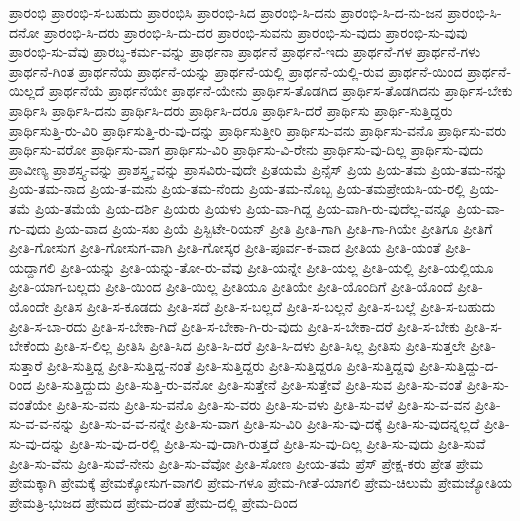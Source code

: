 {ಪ್ರಾರಂಭಿ
ಪ್ರಾರಂಭಿ-ಸ-ಬಹುದು
ಪ್ರಾರಂಭಿಸಿ
ಪ್ರಾರಂಭಿ-ಸಿದ
ಪ್ರಾರಂಭಿ-ಸಿ-ದನು
ಪ್ರಾರಂಭಿ-ಸಿ-ದ-ನು-ಜನ
ಪ್ರಾರಂಭಿ-ಸಿ-ದನೋ
ಪ್ರಾರಂಭಿ-ಸಿ-ದರು
ಪ್ರಾರಂಭಿ-ಸಿ-ದು-ದರ
ಪ್ರಾರಂಭಿ-ಸುವನು
ಪ್ರಾರಂಭಿ-ಸು-ವುದು
ಪ್ರಾರಂಭಿ-ಸು-ವುವು
ಪ್ರಾರಂಭಿ-ಸು-ವೆವು
ಪ್ರಾರಬ್ಧ-ಕರ್ಮ-ವನ್ನು
ಪ್ರಾರ್ಥನಾ
ಪ್ರಾರ್ಥನೆ
ಪ್ರಾರ್ಥನೆ-ಇದು
ಪ್ರಾರ್ಥನೆ-ಗಳ
ಪ್ರಾರ್ಥನೆ-ಗಳು
ಪ್ರಾರ್ಥನೆ-ಗಿಂತ
ಪ್ರಾರ್ಥನೆಯ
ಪ್ರಾರ್ಥನೆ-ಯನ್ನು
ಪ್ರಾರ್ಥನೆ-ಯಲ್ಲಿ
ಪ್ರಾರ್ಥನೆ-ಯಲ್ಲಿ-ರುವ
ಪ್ರಾರ್ಥನೆ-ಯಿಂದ
ಪ್ರಾರ್ಥನೆ-ಯಿಲ್ಲದೆ
ಪ್ರಾರ್ಥನೆಯೆ
ಪ್ರಾರ್ಥನೆಯೇ
ಪ್ರಾರ್ಥನೆ-ಯೇನು
ಪ್ರಾರ್ಥಿಸ-ತೊಡಗಿದ
ಪ್ರಾರ್ಥಿಸ-ತೊಡಗಿದನು
ಪ್ರಾರ್ಥಿಸ-ಬೇಕು
ಪ್ರಾರ್ಥಿಸಿ
ಪ್ರಾರ್ಥಿಸಿ-ದನು
ಪ್ರಾರ್ಥಿಸಿ-ದರು
ಪ್ರಾರ್ಥಿಸಿ-ದರೂ
ಪ್ರಾರ್ಥಿಸಿ-ದರೆ
ಪ್ರಾರ್ಥಿಸು
ಪ್ರಾರ್ಥಿ-ಸುತ್ತಿದ್ದರು
ಪ್ರಾರ್ಥಿಸುತ್ತಿ-ರು-ವಿರಿ
ಪ್ರಾರ್ಥಿಸುತ್ತಿ-ರು-ವು-ದನ್ನು
ಪ್ರಾರ್ಥಿಸುತ್ತೀರಿ
ಪ್ರಾರ್ಥಿಸು-ವನು
ಪ್ರಾರ್ಥಿಸು-ವನೊ
ಪ್ರಾರ್ಥಿಸು-ವರು
ಪ್ರಾರ್ಥಿಸು-ವರೋ
ಪ್ರಾರ್ಥಿಸು-ವಾಗ
ಪ್ರಾರ್ಥಿಸು-ವಿರಿ
ಪ್ರಾರ್ಥಿಸು-ವಿ-ರೇನು
ಪ್ರಾರ್ಥಿಸು-ವು-ದಿಲ್ಲ
ಪ್ರಾರ್ಥಿಸು-ವುದು
ಪ್ರಾವೀಣ್ಯ
ಪ್ರಾಶಸ್ತ್ಯ-ವನ್ನು
ಪ್ರಾಶಸ್ತ್ರ್ಯ-ವನ್ನು
ಪ್ರಾಸವಿರು-ವುದೇ
ಪ್ರಿತಯಮೆ
ಪ್ರಿನ್ಸೆಸ್
ಪ್ರಿಯ
ಪ್ರಿಯ-ತಮ
ಪ್ರಿಯ-ತಮ-ನನ್ನು
ಪ್ರಿಯ-ತಮ-ನಾದ
ಪ್ರಿಯ-ತ-ಮನು
ಪ್ರಿಯ-ತಮ-ನೆಂದು
ಪ್ರಿಯ-ತಮ-ನೊಬ್ಬ
ಪ್ರಿಯ-ತಮಪ್ರೇಯಸಿ-ಯ-ರಲ್ಲಿ
ಪ್ರಿಯ-ತಮೆ
ಪ್ರಿಯ-ತಮೆಯೆ
ಪ್ರಿಯ-ದರ್ಶಿ
ಪ್ರಿಯರು
ಪ್ರಿಯಳು
ಪ್ರಿಯ-ವಾ-ಗಿದ್ದ
ಪ್ರಿಯ-ವಾಗಿ-ರು-ವುದೆಲ್ಲ-ವನ್ನೂ
ಪ್ರಿಯ-ವಾ-ಗು-ವುದು
ಪ್ರಿಯ-ವಾದ
ಪ್ರಿಯ-ಸಖ
ಪ್ರಿಯೆ
ಪ್ರಿಸ್ಬಿಟೇ-ರಿಯನ್
ಪ್ರೀತಿ
ಪ್ರೀತಿ-ಗಾಗಿ
ಪ್ರೀತಿ-ಗಾ-ಗಿಯೇ
ಪ್ರೀತಿಗೂ
ಪ್ರೀತಿಗೆ
ಪ್ರೀತಿ-ಗೋಸುಗ
ಪ್ರೀತಿ-ಗೋಸುಗ-ವಾಗಿ
ಪ್ರೀತಿ-ಗೋಸ್ಕರ
ಪ್ರೀತಿ-ಪೂರ್ವ-ಕ-ವಾದ
ಪ್ರೀತಿಯ
ಪ್ರೀತಿ-ಯಂತೆ
ಪ್ರೀತಿ-ಯದ್ದಾಗಲಿ
ಪ್ರೀತಿ-ಯನ್ನು
ಪ್ರೀತಿ-ಯನ್ನು-ತೋ-ರು-ವೆವು
ಪ್ರೀತಿ-ಯನ್ನೇ
ಪ್ರೀತಿ-ಯಲ್ಲ
ಪ್ರೀತಿ-ಯಲ್ಲಿ
ಪ್ರೀತಿ-ಯಲ್ಲಿಯೂ
ಪ್ರೀತಿ-ಯಾಗ-ಬಲ್ಲದು
ಪ್ರೀತಿ-ಯಿಂದ
ಪ್ರೀತಿ-ಯಿಲ್ಲ
ಪ್ರೀತಿಯೂ
ಪ್ರೀತಿಯೇ
ಪ್ರೀತಿ-ಯೊಂದಿಗೆ
ಪ್ರೀತಿ-ಯೊಂದೆ
ಪ್ರೀತಿ-ಯೊಂದೇ
ಪ್ರೀತಿಸ
ಪ್ರೀತಿ-ಸ-ಕೂಡದು
ಪ್ರೀತಿ-ಸದೆ
ಪ್ರೀತಿ-ಸ-ಬಲ್ಲದೆ
ಪ್ರೀತಿ-ಸ-ಬಲ್ಲನೆ
ಪ್ರೀತಿ-ಸ-ಬಲ್ಲೆ
ಪ್ರೀತಿ-ಸ-ಬಹುದು
ಪ್ರೀತಿ-ಸ-ಬಾ-ರದು
ಪ್ರೀತಿ-ಸ-ಬೇಕಾ-ಗಿದೆ
ಪ್ರೀತಿ-ಸ-ಬೇಕಾ-ಗಿ-ರು-ವುದು
ಪ್ರೀತಿ-ಸ-ಬೇಕಾ-ದರೆ
ಪ್ರೀತಿ-ಸ-ಬೇಕು
ಪ್ರೀತಿ-ಸ-ಬೇಕೆಂದು
ಪ್ರೀತಿ-ಸ-ಲಿಲ್ಲ
ಪ್ರೀತಿಸಿ
ಪ್ರೀತಿ-ಸಿದ
ಪ್ರೀತಿ-ಸಿ-ದರೆ
ಪ್ರೀತಿ-ಸಿ-ದಳು
ಪ್ರೀತಿ-ಸಿಲ್ಲ
ಪ್ರೀತಿಸು
ಪ್ರೀತಿ-ಸುತ್ತಲೇ
ಪ್ರೀತಿ-ಸುತ್ತಾರೆ
ಪ್ರೀತಿ-ಸುತ್ತಿದ್ದ
ಪ್ರೀತಿ-ಸುತ್ತಿದ್ದ-ನಂತೆ
ಪ್ರೀತಿ-ಸುತ್ತಿದ್ದರು
ಪ್ರೀತಿ-ಸುತ್ತಿದ್ದರೂ
ಪ್ರೀತಿ-ಸುತ್ತಿದ್ದವು
ಪ್ರೀತಿ-ಸುತ್ತಿದ್ದು-ದ-ರಿಂದ
ಪ್ರೀತಿ-ಸುತ್ತಿದ್ದುದು
ಪ್ರೀತಿ-ಸುತ್ತಿ-ರು-ವನೋ
ಪ್ರೀತಿ-ಸುತ್ತೇನೆ
ಪ್ರೀತಿ-ಸುತ್ತೇವೆ
ಪ್ರೀತಿ-ಸುವ
ಪ್ರೀತಿ-ಸು-ವಂತೆ
ಪ್ರೀತಿ-ಸು-ವಂತೆಯೇ
ಪ್ರೀತಿ-ಸು-ವನು
ಪ್ರೀತಿ-ಸು-ವನೊ
ಪ್ರೀತಿ-ಸು-ವರು
ಪ್ರೀತಿ-ಸು-ವಳು
ಪ್ರೀತಿ-ಸು-ವಳೆ
ಪ್ರೀತಿ-ಸು-ವ-ವನ
ಪ್ರೀತಿ-ಸು-ವ-ವ-ನನ್ನು
ಪ್ರೀತಿ-ಸು-ವ-ವ-ನನ್ನೇ
ಪ್ರೀತಿ-ಸು-ವಾಗ
ಪ್ರೀತಿ-ಸು-ವಿರಿ
ಪ್ರೀತಿ-ಸು-ವು-ದಕ್ಕೆ
ಪ್ರೀತಿ-ಸು-ವುದನ್ನಲ್ಲದೆ
ಪ್ರೀತಿ-ಸು-ವು-ದನ್ನು
ಪ್ರೀತಿ-ಸು-ವು-ದ-ರಲ್ಲಿ
ಪ್ರೀತಿ-ಸು-ವು-ದಾಗಿ-ರುತ್ತದೆ
ಪ್ರೀತಿ-ಸು-ವು-ದಿಲ್ಲ
ಪ್ರೀತಿ-ಸು-ವುದು
ಪ್ರೀತಿ-ಸುವೆ
ಪ್ರೀತಿ-ಸು-ವೆನು
ಪ್ರೀತಿ-ಸುವೆ-ನೇನು
ಪ್ರೀತಿ-ಸು-ವೆವೋ
ಪ್ರೀತಿ-ಸೋಣ
ಪ್ರೀಯ-ತಮೆ
ಪ್ರೆಸ್
ಪ್ರೇಕ್ಷ-ಕರು
ಪ್ರೇತ
ಪ್ರೇಮ
ಪ್ರೇಮಕ್ಕಾಗಿ
ಪ್ರೇಮಕ್ಕೆ
ಪ್ರೇಮಕ್ಕೋಸುಗ-ವಾಗಲಿ
ಪ್ರೇಮ-ಗಳೂ
ಪ್ರೇಮ-ಗೀತೆ-ಯಾಗಲಿ
ಪ್ರೇಮ-ಚಿಲುಮೆ
ಪ್ರೇಮಜ್ಯೋತಿಯ
ಪ್ರೇಮತ್ರಿ-ಭುಜದ
ಪ್ರೇಮದ
ಪ್ರೇಮ-ದಂತೆ
ಪ್ರೇಮ-ದಲ್ಲಿ
ಪ್ರೇಮ-ದಿಂದ
}
